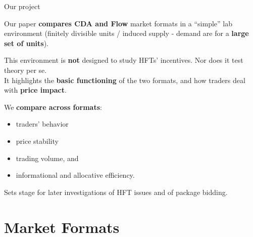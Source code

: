 \documentclass[10pt]{beamer}
\begin{document}

\begin{frame}{Our project}

Our paper \textbf{compares CDA and Flow} market formats in a ``simple'' lab environment (finitely divisible units / induced supply - demand are for a \textbf{large set of units}). 

This environment is \textbf{not} designed to study HFTs' incentives. %
Nor does it test theory per se.  \\ %
It highlights the \textbf{basic functioning} of the two formats, and how traders deal with \textbf{price impact}. %

We \textbf{compare across formats}:
\begin{itemize}
\item traders' behavior %
\item price stability %
\item trading volume, and %
\item informational and allocative efficiency. 
\end{itemize} 

Sets stage for later investigations of HFT issues and of package bidding.

\end{frame}

\section{Market Formats}
\end{document}
